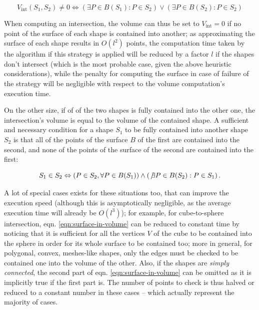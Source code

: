 \begin{equation} \label{eqn:no-surface-in-volume}
  V_{\text{int}}\left(S_1,S_2\right)\neq 0 \Leftrightarrow \left(\exists P \in
    B\left(S_1\right) : P \in S_2\right) \vee \left(\exists P \in
    B\left(S_2\right) : P \in S_2\right) 
\end{equation}

When computing an intersection, the volume can thus be set to $V_{\text{int}}=0$
if no point of the surface of each shape is contained into another; as
approximating the surface of each shape results in $O(l^2)$ points, the
computation time taken by the algorithm if this strategy is applied will be
reduced by a factor $l$ if the shapes don't intersect (which is the most
probable case, given the above heuristic considerations), while the penalty for
computing the surface in case of failure of the strategy will be negligible with
respect to the volume computation's execution time.

On the other size, if of of the two shapes is fully contained into the other
one, the intersection's volume is equal to the volume of the contained shape.
A sufficient and necessary condition for a shape $S_1$ to be fully contained into
another shape $S_2$ is that all of the points of the surface $B$ of the first
are contained into the second, and none of the points of the surface of the
second are contained into the first:

\begin{equation} \label{eqn:surface-in-volume}
  S_1 \in S_2 \Leftrightarrow \left( P \in S_2 , \forall P \in B(S_1) \right)
  \wedge \left( \not \exists P \in B(S_2) : P \in S_1 \right).
\end{equation}

A lot of special cases exists for these situations too, that can improve the
execution speed (although this is asymptotically negligible, as the average
execution time will already be $O(l^3)$); for example, for cube-to-sphere
intersection, eqn. \ref{eqn:surface-in-volume} can be reduced to constant time by
noticing that it is sufficient for all the vertices $V$ of the cube to be
contained into the sphere in order for its whole surface to be contained too;
more in general, for polygonal, convex, meshes-like shapes, only the edges must
be checked to be contained one into the volume of the other. Also, if the shapes
are \emph{simply connected}, the second part of eqn. \ref{eqn:surface-in-volume}
can be omitted as it is implicitly true if the first part is. The number of
points to check is thus halved or reduced to a constant number in these cases --
which actually represent the majority of cases.

